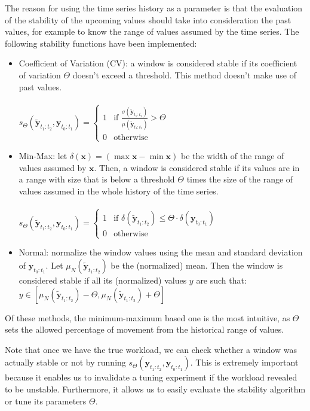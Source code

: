 \documentclass[a4paper, 12pt]{article} %
\begin{document}
	The reason for using the time series history as a parameter is that the evaluation of the stability of the upcoming values should take into consideration the past values, for example to know the range of values  assumed by the time series. The following stability functions have been implemented:
	\begin{itemize}
		\item Coefficient of Variation (CV): a window is considered stable if its coefficient of variation $\Theta$ doesn't exceed a threshold. This method doesn't make use of past values.\\\\
		$
		s_\Theta(\tilde{\pmb{y}}_{t_1:t_2}, \pmb{y}_{t_0:t_1}) = \begin{cases}
			1 & \text{if } \frac{\sigma (\tilde{\pmb{y}}_{t_1:t_2})}{\mu (\tilde{\pmb{y}}_{t_1:t_2})} > \Theta\\
			0 & \text{otherwise}
		\end{cases}    
		$
		\item Min-Max: let $\delta (\pmb{x}) = (\max{\pmb{x}} - \min{\pmb{x}})$ be the width of the range of values assumed by $\pmb{x}$. Then, a window is considered stable if its values are in a range with size that is below a threshold $\Theta$ times the size of the range of values assumed in the whole history of the time series.\\\\
		$
		s_\Theta(\tilde{\pmb{y}}_{t_1:t_2}, \pmb{y}_{t_0:t_1}) = \begin{cases}
			1 & \text{if } \delta (\tilde{\pmb{y}}_{t_1:t_2}) \leq \Theta \cdot \delta (\pmb{y}_{t_0:t_1}) \\
			0 & \text{otherwise}
		\end{cases}    
		$
		\item Normal: normalize the window values using the mean and standard deviation of $\pmb{y}_{t_0:t_1}$. Let $\mu_N (\tilde{\pmb{y}}_{t_1:t_2})$ be the (normalized) mean. Then the window is considered stable if all its (normalized) values $y$ are such that: $y \in [\mu_N (\tilde{\pmb{y}}_{t_1:t_2}) - \Theta, \mu_N (\tilde{\pmb{y}}_{t_1:t_2}) + \Theta]$
	\end{itemize}
	Of these methods, the minimum-maximum based one is the most intuitive, as $\Theta$ sets the allowed percentage of movement from the historical range of values.
	
	Note that once we have the true workload, we can check whether a window was actually stable or not by running $s_\Theta(\pmb{y}_{t_1:t_2}, \pmb{y}_{t_0:t_1})$. This is extremely important because it enables us to invalidate a tuning experiment if the workload revealed to be unstable. Furthermore, it allows us to easily evaluate the stability algorithm or tune its parameters $\Theta$.
	
\end{document}

